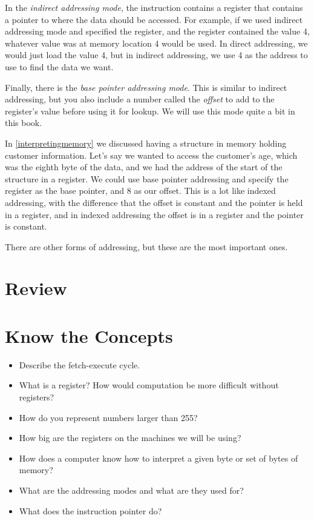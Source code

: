 In the \emph{indirect addressing mode}, the instruction contains
a register that contains a pointer to where the data should be accessed.
For example, if we used indirect addressing mode and specified the {\eaxReg} 
register, and the {\eaxReg} register contained the value 4, whatever value was 
at memory location 4 would be used.  In direct addressing, we would just 
load the value 4, but in indirect addressing, we use 4 as the address to use 
to find the data we want.

Finally, there is the \emph{base pointer addressing mode}.  This is
similar to indirect addressing, but you also include a number called the
\emph{offset} to add to the register's value before using it for lookup.  We will use this 
mode quite a bit in this book.

  
In \autoref{interpretingmemory} we discussed having a structure
in memory holding customer information.  Let's say we wanted to access
the customer's age, which was the eighth byte of the data, and we had the address 
of the start of the structure in a register.  We could use base pointer 
addressing and specify the register as the base pointer, and 8 as our offset.
This is a lot like indexed addressing, with the difference that the offset is
constant and the pointer is held in a register, and in indexed addressing
the offset is in a register and the pointer is constant.

There are other forms of addressing, but these are the most
important  ones.

\section{Review}

\section{Know the Concepts}

\begin{itemize}\item Describe the fetch-execute cycle. 
\item What is a register?  How would computation be more difficult without registers? 
\item How do you represent numbers larger than 255? 
\item How big are the registers on the machines we will be using? 
\item How does a computer know how to interpret a given byte or set of bytes of memory? 
\item What are the addressing modes and what are they used for? 
\item What does the instruction pointer do? 
\end{itemize}

